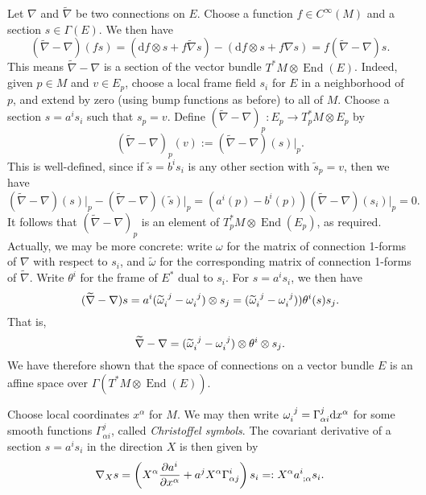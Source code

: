 \documentclass{book}
\renewcommand{\d}{\mathrm{d}}
\newcommand{\parens}[1]{\left( {#1} \right)}
\newcommand{\pdv}[2]{\frac{\partial{#1}}{\partial{#2}}}
\DeclareMathOperator{\End}{\mathrm{End}}
\theoremstyle{definition}
\numberwithin{equation}{section}
\begin{document}
Let $\nabla$ and $\widetilde{\nabla}$ be two connections on $E$. Choose a function $f \in C^\infty(M)$ and a section $s \in \Gamma(E)$. We then have
\begin{equation}
    (\widetilde{\nabla} - \nabla)(fs) = (\d f \otimes s + f\widetilde{\nabla}s) - (\d f \otimes s + f\nabla s) = f(\widetilde{\nabla} - \nabla)s.
\end{equation}
This means $\widetilde{\nabla} - \nabla$ is a section of the vector bundle $T^*M \otimes \End(E)$. Indeed, given $p \in M$ and $v \in E_p$, choose a local frame field $s_i$ for $E$ in a neighborhood of $p$, and extend by zero (using bump functions as before) to all of $M$. Choose a section $s = a^i s_i$ such that $s_p = v$. Define $(\widetilde{\nabla} - \nabla)_p \colon E_p \to T_p^*M \otimes E_p$ by 
\begin{equation}
    (\widetilde{\nabla} - \nabla)_p(v) := (\widetilde{\nabla} - \nabla)(s)\vert_p.
\end{equation}
This is well-defined, since if $\widetilde{s} = b^i s_i$ is any other section with $\widetilde{s}_p = v$, then we have 
\begin{equation}
    (\widetilde{\nabla} - \nabla)(s)\vert_p - (\widetilde{\nabla} - \nabla)(\widetilde{s})\vert_p 
    = (a^i(p) - b^i(p))(\widetilde{\nabla} - \nabla)(s_i)\vert_p
    = 0.
\end{equation}
It follows that $(\widetilde{\nabla} - \nabla)_p$ is an element of $T^*_pM \otimes \End(E_p)$, as required. Actually, we may be more concrete: write $\omega$ for the matrix of connection 1-forms of $\nabla$ with respect to $s_i$, and $\widetilde{\omega}$ for the corresponding matrix of connection 1-forms of $\widetilde{\nabla}$. Write $\theta^i$ for the frame of $E^*$ dual to $s_i$. For $s = a^i s_i$, we then have 
\begin{equation}
    (\widetilde{\nabla} - \nabla)s 
    = a^i(\tensor{\widetilde{\omega}}{_i^j} - \tensor{\omega}{_i^j}) \otimes s_j 
    = (\tensor{\widetilde{\omega}}{_i^j} - \tensor{\omega}{_i^j})) \theta^i(s) s_j.
\end{equation}
That is,
\begin{equation}
    \widetilde{\nabla} - \nabla = (\tensor{\widetilde{\omega}}{_i^j} - \tensor{\omega}{_i^j}) \otimes \theta^i \otimes s_j.
\end{equation}
We have therefore shown that the space of connections on a vector bundle $E$ is an affine space over $\Gamma(T^*M \otimes \End(E))$.

Choose local coordinates $x^\alpha$ for $M$. We may then write $\tensor{\omega}{_i^j} = \Gamma_{\alpha i}^j \d x^\alpha$ for some smooth functions $\Gamma_{\alpha i}^j$, called \textit{Christoffel symbols}. The covariant derivative of a section $s = a^i s_i$ in the direction $X$ is then given by 
\begin{equation} \label{eq:coordinateCovDer}
    \nabla_X s = \parens{ X^\alpha \pdv{a^i}{x^\alpha} + a^j X^\alpha \Gamma_{\alpha j}^i } s_i =: X^\alpha \tensor{a}{^i_{;\alpha}} s_i.
\end{equation}
\end{document}
